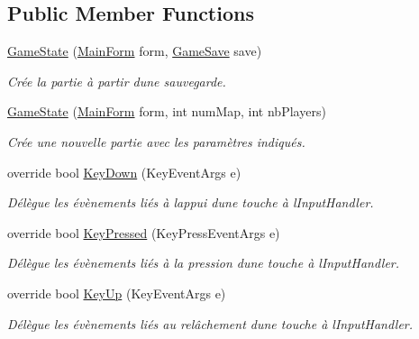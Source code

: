 \subsection*{Public Member Functions}
\begin{DoxyCompactItemize}
\item 
\hyperlink{class_tentacle_slicers_1_1windows_1_1_game_state_a040ca1d4586473de5d08f351494df8ba}{Game\+State} (\hyperlink{class_tentacle_slicers_1_1windows_1_1_main_form}{Main\+Form} form, \hyperlink{class_tentacle_slicers_1_1maps_1_1_game_save}{Game\+Save} save)
\begin{DoxyCompactList}\small\item\em Crée la partie à partir d\textquotesingle{}une sauvegarde. \end{DoxyCompactList}\item 
\hyperlink{class_tentacle_slicers_1_1windows_1_1_game_state_af85c9746fa3d2d41200fadf913eebd85}{Game\+State} (\hyperlink{class_tentacle_slicers_1_1windows_1_1_main_form}{Main\+Form} form, int num\+Map, int nb\+Players)
\begin{DoxyCompactList}\small\item\em Crée une nouvelle partie avec les paramètres indiqués. \end{DoxyCompactList}\item 
override bool \hyperlink{class_tentacle_slicers_1_1windows_1_1_game_state_a5c14a1f42f191bcd140ed439bd9333e1}{Key\+Down} (Key\+Event\+Args e)
\begin{DoxyCompactList}\small\item\em Délègue les évènements liés à l\textquotesingle{}appui d\textquotesingle{}une touche à l\textquotesingle{}Input\+Handler. \end{DoxyCompactList}\item 
override bool \hyperlink{class_tentacle_slicers_1_1windows_1_1_game_state_ad3ef60d5743fafada6620b4281560470}{Key\+Pressed} (Key\+Press\+Event\+Args e)
\begin{DoxyCompactList}\small\item\em Délègue les évènements liés à la pression d\textquotesingle{}une touche à l\textquotesingle{}Input\+Handler. \end{DoxyCompactList}\item 
override bool \hyperlink{class_tentacle_slicers_1_1windows_1_1_game_state_a3457252ae6d879e134167351a3b16445}{Key\+Up} (Key\+Event\+Args e)
\begin{DoxyCompactList}\small\item\em Délègue les évènements liés au relâchement d\textquotesingle{}une touche à l\textquotesingle{}Input\+Handler. \end{DoxyCompactList}\item 

\end{DoxyCompactItemize}
